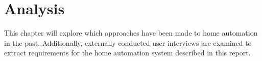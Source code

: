 \chapter{Analysis}\label{part:analysis}

This chapter will explore which approaches have been made to home automation in the past. Additionally, externally conducted user interviews are examined to extract requirements for the home automation system described in this report.




